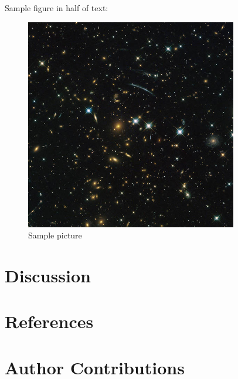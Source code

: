 \documentclass[a4paper, 12pt]{report}
\begin{document}
\begin{multicols}{2}
Sample figure in half of text:
\begin{figure}
\includegraphics[width=\linewidth]{figures/space.png}
\caption{Sample picture}
\end{figure}
\lipsum[5]

\section{Discussion}
\lipsum[6]

\section{References}
\lipsum[7]

\end{multicols}

\section{Author Contributions}
\lipsum[8]
\end{document}
